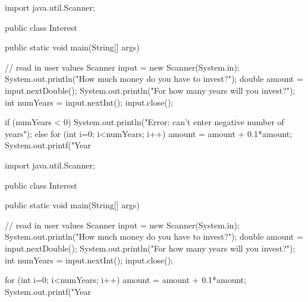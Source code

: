 \documentclass[answers,addpoints]{exam} %
\begin{document}
\begin{questions}
\begin{solution}
\begin{code}
import java.util.Scanner; 

public class Interest {
  public static void main(String[] args) {
    // read in user values
    Scanner input = new Scanner(System.in);
    System.out.println("How much money do you have to invest?");
    double amount = input.nextDouble();
    System.out.println("For how many years will you invest?");
    int numYears = input.nextInt();
    input.close();
    
    if (numYears < 0) {
      System.out.println("Error: can't enter negative number of years");
    }
    else {
      for (int i=0; i<numYears; i++) {
        amount = amount + 0.1*amount; 
        System.out.printf("Year %
      }
    }
  }
}
\end{code}

\begin{code}
import java.util.Scanner; 

public class Interest {
  public static void main(String[] args) {
    // read in user values
    Scanner input = new Scanner(System.in);
    System.out.println("How much money do you have to invest?");
    double amount = input.nextDouble();
    System.out.println("For how many years will you invest?");
    int numYears = input.nextInt();
    input.close();
    
    for (int i=0; i<numYears; i++) {
      amount = amount + 0.1*amount; 
      System.out.printf("Year %
    }
  }
}
\end{code}

\end{solution}

\end{questions}
\end{document}
